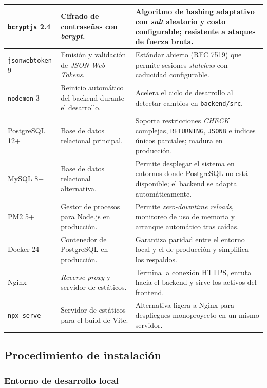 \documentclass[12pt,letterpaper]{article}
\begin{document}
\begin{longtable}{p{}p{}p{}}
\texttt{bcryptjs} 2.4 & Cifrado de contraseñas con \textit{bcrypt}. & Algoritmo de hashing adaptativo con \textit{salt} aleatorio y costo configurable; resistente a ataques de fuerza bruta.\\\hline
\texttt{jsonwebtoken} 9 & Emisión y validación de \textit{JSON Web Tokens}. & Estándar abierto (RFC 7519) que permite sesiones \textit{stateless} con caducidad configurable.\\\hline
\texttt{nodemon} 3 & Reinicio automático del backend durante el desarrollo. & Acelera el ciclo de desarrollo al detectar cambios en \texttt{backend/src}.\\\hline
PostgreSQL 12+ & Base de datos relacional principal. & Soporta restricciones \textit{CHECK} complejas, \texttt{RETURNING}, \texttt{JSONB} e índices únicos parciales; madura en producción.\\\hline
MySQL 8+ & Base de datos relacional alternativa. & Permite desplegar el sistema en entornos donde PostgreSQL no está disponible; el backend se adapta automáticamente.\\\hline
PM2 5+ & Gestor de procesos para Node.js en producción. & Permite \textit{zero-downtime reloads}, monitoreo de uso de memoria y arranque automático tras caídas.\\\hline
Docker 24+ & Contenedor de PostgreSQL en producción. & Garantiza paridad entre el entorno local y el de producción y simplifica los respaldos.\\\hline
Nginx & \textit{Reverse proxy} y servidor de estáticos. & Termina la conexión HTTPS, enruta hacia el backend y sirve los activos del frontend.\\\hline
\texttt{npx serve} & Servidor de estáticos para el build de Vite. & Alternativa ligera a Nginx para despliegues monoproyecto en un mismo servidor.\\\bottomrule
\end{longtable}

\subsection{Procedimiento de instalación}

\subsubsection{Entorno de desarrollo local}
\end{document}
